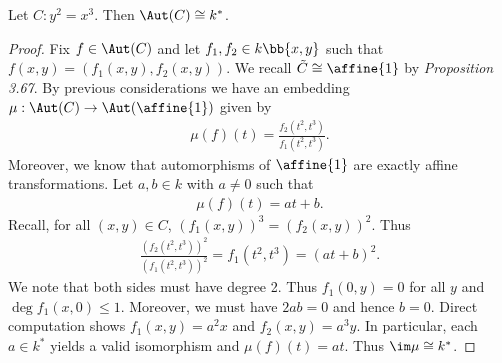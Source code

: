 \documentclass{article}
\begin{document}
\begin{claim*}[2]
  Let $C:y^2=x^3$. Then $\Aut(C)\cong k^*$.
  \begin{proof}
    Fix $f\in\Aut(C)$ and let $f_1,f_2\in k\bb{x,y}$ such that $f(x,y) = (f_1(x,y),f_2(x,y))$.
    We recall $\tilde C\cong \affine{1}$ by \emph{Proposition 3.67}. By previous considerations
    we have an embedding $\mu:\Aut(C)\to\Aut(\affine{1})$ given by
    \begin{align*}
      \mu(f)(t) = \frac{f_2(t^2,t^3)}{f_1(t^2,t^3)}.
    \end{align*}
    Moreover, we know that automorphisms of $\affine{1}$ are exactly affine transformations.
    Let $a,b\in k$ with $a\neq 0$ such that
    \begin{align}\label{eq:linearity2}
      \mu(f)(t) = at+b.
    \end{align}
    Recall, for all $(x,y)\in C$, $(f_1(x,y))^3 = (f_2(x,y))^2$. Thus
    \begin{align*}
      \frac{(f_2(t^2,t^3))^2}{(f_1(t^2,t^3))^2}
      = f_1(t^2,t^3) = (at + b)^2.
    \end{align*}
    We note that both sides must have degree 2. Thus $f_1(0,y)=0$ for all $y$
    and $\deg f_1(x,0)\leq 1$. Moreover, we must have $2ab = 0$ and hence $b=0$.
    Direct computation shows $f_1(x,y) = a^2 x$ and $f_2(x,y)=a^3 y$.
    In particular, each $a\in k^*$ yields a valid isomorphism and $\mu(f)(t) = at$.
    Thus $\im\mu \cong k^*$.
  \end{proof}
\end{claim*}
\end{document}
